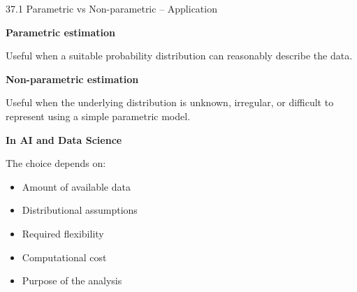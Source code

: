 \begin{frame}{37.1 Parametric vs Non-parametric -- Application}

\textbf{Parametric estimation}

Useful when a suitable probability distribution can reasonably
describe the data.

\vspace{0.1cm}

\textbf{Non-parametric estimation}

Useful when the underlying distribution is unknown,
irregular, or difficult to represent using a simple
parametric model.

\vspace{0.1cm}

\textbf{In AI and Data Science}

The choice depends on:

\begin{itemize}
    \item Amount of available data
    \item Distributional assumptions
    \item Required flexibility
    \item Computational cost
    \item Purpose of the analysis
\end{itemize}

\vspace{0.1cm}

\end{frame}